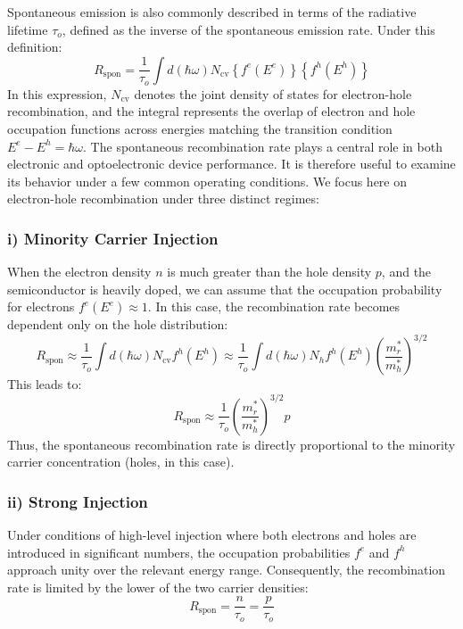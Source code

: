 Spontaneous emission is also commonly described in terms of the radiative lifetime \( \tau_o \), defined as the inverse of the spontaneous emission rate. Under this definition:
\begin{equation}
	R_{\text{spon}} = \frac{1}{\tau_o} \int d(\hbar \omega) N_{\text{cv}} \left\{ f^e(E^e) \right\} \left\{ f^h(E^h) \right\}
\end{equation}
In this expression, \( N_{\text{cv}} \) denotes the joint density of states for electron-hole recombination, and the integral represents the overlap of electron and hole occupation functions across energies matching the transition condition \( E^e - E^h = \hbar \omega \).
The spontaneous recombination rate plays a central role in both electronic and optoelectronic device performance. It is therefore useful to examine its behavior under a few common operating conditions. We focus here on electron-hole recombination under three distinct regimes:
\subsubsection*{i) Minority Carrier Injection}
When the electron density \( n \) is much greater than the hole density \( p \), and the semiconductor is heavily doped, we can assume that the occupation probability for electrons \( f^e(E^e) \approx 1 \). In this case, the recombination rate becomes dependent only on the hole distribution:
\begin{equation}
	R_{\text{spon}} \approx \frac{1}{\tau_o} \int d(\hbar \omega) N_{\text{cv}} f^h(E^h) \approx \frac{1}{\tau_o} \int d(\hbar \omega) N_h f^h(E^h) \left( \frac{m_r^*}{m_h^*} \right)^{3/2}
\end{equation}
This leads to:
\begin{equation}
	R_{\text{spon}} \approx \frac{1}{\tau_o} \left( \frac{m_r^*}{m_h^*} \right)^{3/2} p
\end{equation}
Thus, the spontaneous recombination rate is directly proportional to the minority carrier concentration (holes, in this case).
\subsubsection*{ii) Strong Injection}
Under conditions of high-level injection where both electrons and holes are introduced in significant numbers, the occupation probabilities \( f^e \) and \( f^h \) approach unity over the relevant energy range. Consequently, the recombination rate is limited by the lower of the two carrier densities:
\begin{equation}
	R_{\text{spon}} = \frac{n}{\tau_o} = \frac{p}{\tau_o}
\end{equation}
